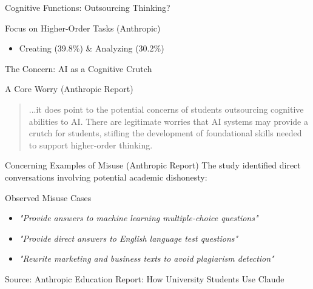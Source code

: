 \documentclass{beamer}
\begin{document}
\begin{frame}{Cognitive Functions: Outsourcing Thinking?}

\begin{block}{Focus on Higher-Order Tasks (Anthropic)}
\begin{itemize}
    \item Creating (39.8\%) \& Analyzing (30.2\%)
\end{itemize}
\end{block}

\begin{figure}
    \centering
\end{figure}

\end{frame}

\begin{frame}{The Concern: AI as a Cognitive Crutch}
\begin{alertblock}{A Core Worry (Anthropic Report)}
\blockquote{...it does point to the potential concerns of students outsourcing cognitive abilities to AI. There are legitimate worries that AI systems may provide a crutch for students, stifling the development of foundational skills needed to support higher-order thinking.}
\end{alertblock}
\end{frame}

\begin{frame}{Concerning Examples of Misuse (Anthropic Report)}
The study identified direct conversations involving potential academic dishonesty:

\begin{block}{Observed Misuse Cases}
\begin{itemize}
\item \textit{"Provide answers to machine learning multiple-choice questions"}
\item \textit{"Provide direct answers to English language test questions"}
\item \textit{"Rewrite marketing and business texts to avoid plagiarism detection"}
\end{itemize}
\end{block}
\vspace{0.5cm}
\footnotesize{Source: Anthropic Education Report: How University Students Use Claude}
\end{frame}
\end{document}
